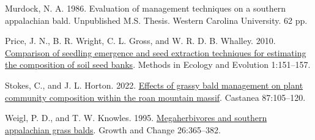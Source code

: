 \documentclass[
]{article}
\newlength{\cslhangindent}
\newlength{\cslentryspacingunit} %
\newenvironment{CSLReferences}[2] %
 {%
  \setlength{\parindent}{0pt}
  \ifodd #1
  \let\oldpar\par
  \def\par{\hangindent=\cslhangindent\oldpar}
  \fi
  \setlength{\parskip}{#2\cslentryspacingunit}
 }%
 {}
\begin{document}
\begin{CSLReferences}{1}{0}
\leavevmode{}%
Murdock, N. A. 1986. Evaluation of management techniques on a southern appalachian bald. Unpublished M.S. Thesis. Western Carolina University. 62 pp.

\leavevmode{}%
Price, J. N., B. R. Wright, C. L. Gross, and W. R. D. B. Whalley. 2010. \href{https://doi.org/10.1111/j.2041-210X.2010.00011.x}{Comparison of seedling emergence and seed extraction techniques for estimating the composition of soil seed banks}. Methods in Ecology and Evolution 1:151--157.

\leavevmode{}%
Stokes, C., and J. L. Horton. 2022. \href{https://doi.org/10.2179/0008-7475.87.1.105}{Effects of grassy bald management on plant community composition within the roan mountain massif}. Castanea 87:105--120.

\leavevmode{}%
Weigl, P. D., and T. W. Knowles. 1995. \href{https://doi.org/10.1111/j.1468-2257.1995.tb00176.x}{Megaherbivores and southern appalachian grass balds}. Growth and Change 26:365--382.

\end{CSLReferences}
\end{document}
